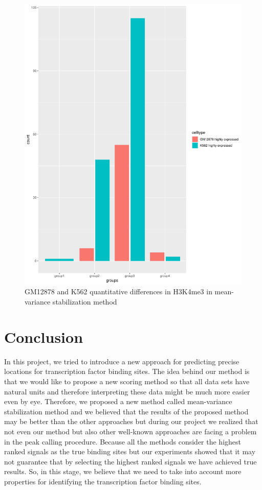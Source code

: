 \documentclass[11pt,letterpaper]{article}
\begin{document}
\begin{figure}[h]
	\begin{center}
		\includegraphics[scale=.3]{FE-H3K4me3-GM12878-K562.PDF}
		\vspace*{8pt}
		\caption{GM12878 and K562 quantitative differences in H3K4me3 in mean-variance stabilization method}
		\label{fig:go2}
		
	\end{center}
\end{figure}


\section{Conclusion}
In this project, we tried to introduce a new approach for predicting precise locations for transcription factor binding sites.
The idea behind our method is that we would like to propose a new scoring method so that all data sets have natural units and therefore interpreting these data might be much more easier even by eye.
Therefore, we proposed a new method called mean-variance stabilization method and we believed that the results of the proposed method may be better than the other approaches but during our project we realized that not even our method but also other well-known approaches are facing a problem in the peak calling procedure. Because all the methods consider the highest ranked signals as the true binding sites but our experiments showed that it may not guarantee that by selecting the highest ranked signals we have achieved true results.
So, in this stage, we believe that we need to take into account more properties for identifying the transcription factor binding sites.  
\end{document}
